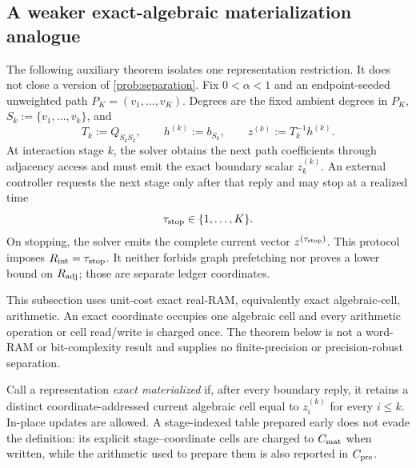 \subsection{A weaker exact-algebraic materialization analogue}
\label{sec:online-path-separation}

The following auxiliary theorem isolates one representation restriction.  It
does not close a version of \cref{prob:separation}.  Fix $0<\alpha<1$ and an
endpoint-seeded unweighted path $P_K=(v_1,\ldots,v_K)$.  Degrees are the fixed
ambient degrees in $P_K$, $S_k:=\{v_1,\ldots,v_k\}$, and
\begin{equation}
 T_k:=Q_{S_kS_k},\qquad
 h^{(k)}:=b_{S_k},\qquad
 z^{(k)}:=T_k^{-1}h^{(k)}.
 \label{eq:online-prefix-system}
\end{equation}
At interaction stage $k$, the solver obtains the next path coefficients
through adjacency access and must emit the exact boundary scalar
$z_k^{(k)}$.  An external controller requests the next stage only after that
reply and may stop at a realized time
\[
 \tau_{\rm stop}\in\{1,\ldots,K\}.
\]
On stopping, the solver emits the complete current vector
$z^{(\tau_{\rm stop})}$.  This protocol imposes
$R_{\rm int}=\tau_{\rm stop}$.  It neither forbids graph prefetching nor proves
a lower bound on $R_{\rm adj}$; those are separate ledger coordinates.

This subsection uses unit-cost exact real-RAM, equivalently exact
algebraic-cell, arithmetic.  An exact coordinate occupies one algebraic cell
and every arithmetic operation or cell read/write is charged once.  The
theorem below is not a word-RAM or bit-complexity result and supplies no
finite-precision or precision-robust separation.

Call a representation \emph{exact materialized} if, after every boundary
reply, it retains a distinct coordinate-addressed current algebraic cell equal
to $z_i^{(k)}$ for every $i\leq k$.  In-place updates are allowed.  A
stage-indexed table prepared
early does not evade the definition: its explicit stage--coordinate cells are
charged to $C_{\rm mat}$ when written, while the arithmetic used to prepare
them is also reported in $C_{\rm pre}$.

